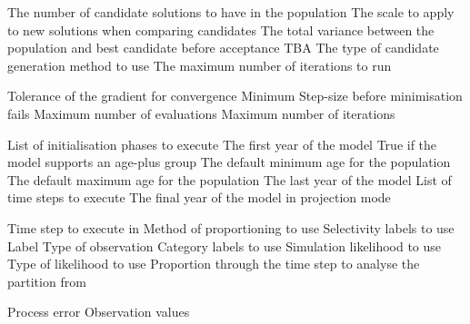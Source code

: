 \par\textbf{}\par
{} {The number of candidate solutions to have in the population}
 {The scale to apply to new solutions when comparing candidates}
 {The total variance between the population and best candidate before acceptance}
 {TBA}
 {The type of candidate generation method to use}
 {The maximum number of iterations to run}
\par\textbf{}\par
\par\textbf{}\par
{} {Tolerance of the gradient for convergence}
 {Minimum Step-size before minimisation fails}
 {Maximum number of evaluations}
 {Maximum number of iterations}
\par\par
{} {List of initialisation phases to execute}
 {The first year of the model}
 {True if the model supports an age-plus group}
 {The default minimum age for the population}
 {The default maximum age for the population}
 {The last year of the model}
 {List of time steps to execute}
 {The final year of the model in projection mode}
\par\par
{} {Time step to execute in}
 {Method of proportioning to use}
 {Selectivity labels to use}
 {Label}
 {Type of observation}
 {Category labels to use}
 {Simulation likelihood to use}
 {Type of likelihood to use}
 {Proportion through the time step to analyse the partition from}
\par\textbf{}\par
{} {Process error}
 {Observation values}
